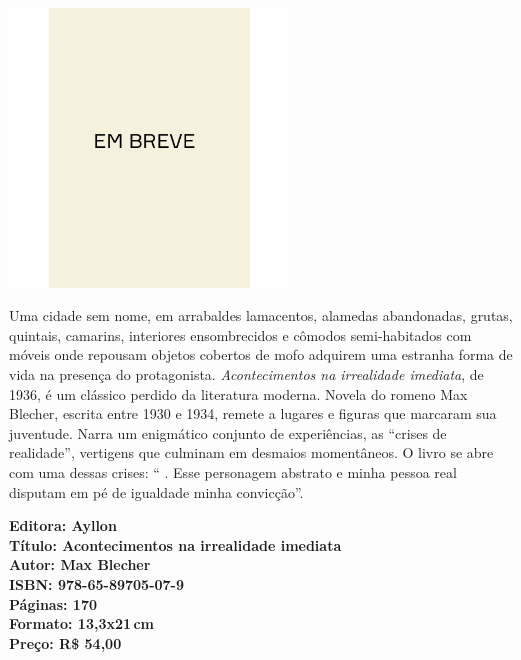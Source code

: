 \begin{center}
\hspace*{.5cm}\includegraphics[width=74mm]{./CAPAS/breve.jpeg}
\end{center}
\hspace*{-7cm}\hrulefill\hspace*{-7cm}
\medskip

\noindent{}Uma cidade sem nome, em arrabaldes lamacentos, alamedas abandonadas, grutas, quintais, camarins, interiores ensombrecidos e cômodos semi-habitados com móveis onde repousam objetos cobertos de mofo adquirem uma estranha forma de vida na presença do protagonista.
\textit{Acontecimentos na irrealidade imediata}, de 1936, é um clássico perdido da literatura moderna. Novela do romeno Max Blecher, escrita entre 1930 e 1934, remete a lugares e figuras que marcaram sua juventude. Narra um enigmático conjunto de experiências, as ``crises de realidade'', vertigens que culminam em desmaios momentâneos. O livro se abre com uma dessas crises: `` . Esse personagem abstrato e minha pessoa real disputam em pé de igualdade minha convicção''.

\vfill
\noindent\begin{minipage}[c]{1\linewidth}
{\small\textbf{
\hspace*{-.1cm}Editora: Ayllon\\
Título: Acontecimentos na irrealidade imediata\\
Autor: Max Blecher\\ 
ISBN: 978-65-89705-07-9\\
Páginas: 170\\
Formato: 13,3x21\,cm\\
Preço: R\$ 54,00\\
}}
\end{minipage}
\pagebreak

